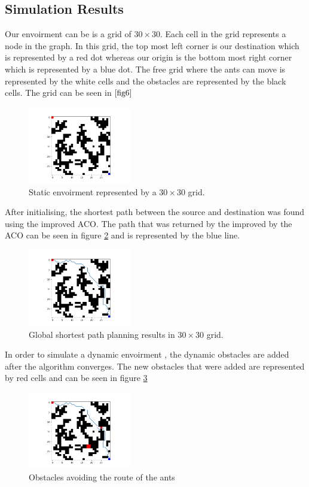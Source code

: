 \documentclass[conference]{IEEEtran}
\begin{document}
\subsection{Simulation Results}
Our envoirment can be is a grid of $30 \times 30$. Each cell in the grid represents a node in the graph. In this grid, the top most left corner is our destination which is represented by a red dot whereas our origin is the bottom most right corner which is represented by a blue dot. The free grid where the ants can move is represented by the white cells and the obstacles are represented by the black cells. The grid can be seen in $\ref{fig6}$
\begin{figure}[H]
    \centering
    \includegraphics[width=0.4\textwidth]{30x30_grid.png}
    \caption{Static envoirment represented by a $30 \times 30$ grid. }
    \label{fig6}
\end{figure}
After initialising, the shortest path between the source and destination was found using the improved ACO. The path that was returned by the improved by the ACO can be seen in figure \ref{fig7} and is represented by the blue line.
\begin{figure}[H]
    \centering
    \includegraphics[width=0.4\textwidth]{30x30 grid (ACO Dynamic 1).png}
    \caption{Global shortest path planning results in $30 \times 30$ grid. }
    \label{fig7}
\end{figure}
In order to simulate a dynamic envoirment , the dynamic obstacles are added after the algorithm converges. The new obstacles that were added are represented by red cells and can be seen in figure \ref{fig8}
\begin{figure}[H]
    \centering
    \includegraphics[width=0.4\textwidth]{30x30 grid (ACO Dynamic 2).png}
    \caption{Obstacles avoiding the route of the ants }
    \label{fig8}
\end{figure}
\end{document}
